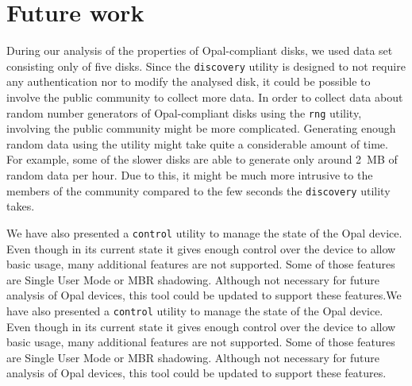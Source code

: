 \section{Future work}


During our analysis of the properties of Opal-compliant disks, we used data set consisting only of five disks. Since the \verb|discovery| utility is designed to not require any authentication nor to modify the analysed disk, it could be possible to involve the public community to collect more data. In order to collect data about random number generators of Opal-compliant disks using the \verb|rng| utility, involving the public community might be more complicated. Generating enough random data using the utility might take quite a considerable amount of time. For example, some of the slower disks are able to generate only around 2~MB of random data per hour. Due to this, it might be much more intrusive to the members of the community compared to the few seconds the \verb|discovery| utility takes.

We have also presented a \verb|control| utility to manage the state of the Opal device. Even though in its current state it gives enough control over the device to allow basic usage, many additional features are not supported. Some of those features are Single User Mode or MBR shadowing. Although not necessary for future analysis of Opal devices, this tool could be updated to support these features.We have also presented a \verb|control| utility to manage the state of the Opal device. Even though in its current state it gives enough control over the device to allow basic usage, many additional features are not supported. Some of those features are Single User Mode or MBR shadowing. Although not necessary for future analysis of Opal devices, this tool could be updated to support these features.










\newpage

\setcounter{biburllcpenalty}{7000}
\setcounter{biburlucpenalty}{8000}
\printbibliography[heading=bibintoc] %



